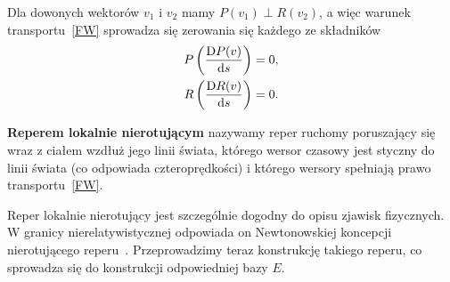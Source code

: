 Dla dowonych wektorów $v_1$ i $v_2$ mamy $P(v_1)\perp R(v_2)$,
a więc warunek transportu~\eqref{FW} 
sprowadza się zerowania się każdego ze składników
\begin{align*}
P \left(\frac{\text{D} P(v)}{\text{d} s} \right)  = 0 ,\\
R \left( \frac{\text{D} R(v)}{\text{d} s} \right) = 0.
\end{align*}




\begin{definition}
\textbf{Reperem lokalnie nierotującym} nazywamy reper ruchomy poruszający
się wraz z ciałem wzdłuż jego linii świata, którego 
wersor czasowy jest styczny do linii świata (co odpowiada czteroprędkości)
i którego wersory spełniają prawo transportu~\eqref{FW}.
\end{definition}
Reper lokalnie nierotujący jest szczególnie dogodny do opisu zjawisk 
fizycznych. W granicy nierelatywistycznej odpowiada on Newtonowskiej 
koncepcji nierotującego reperu~\cite{synge1960}. Przeprowadzimy teraz
konstrukcję takiego reperu, co sprowadza się do konstrukcji 
odpowiedniej bazy $E$.

